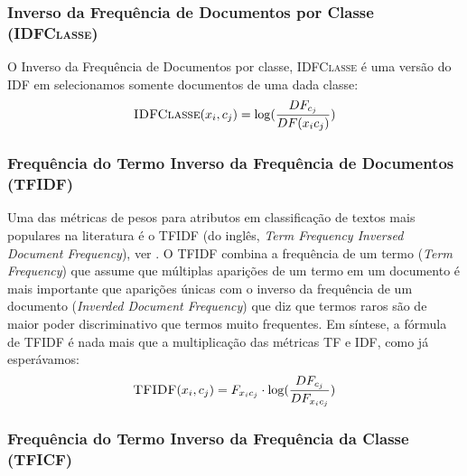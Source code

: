 
\subsubsection{Inverso da Frequência de Documentos por Classe (\textsc{IDFClasse})}
\label{subsubsection::idf}

O Inverso da Frequência de Documentos por classe, \textsc{IDFClasse} é uma versão do \textsc{IDF} em selecionamos somente documentos de uma dada classe:
\begin{equation}\label{eqn::tficf}
 \textsc{IDFClasse}(x_i,c_j) = \log( \frac{DF_{c_j}} {DF(x_ic_j)} )
\end{equation}



\subsubsection{Frequência do Termo Inverso da Frequência de Documentos (\textsc{TFIDF})}
\label{subsubsection::tfidf}

Uma das métricas de pesos para atributos em classificação de textos mais populares na literatura é o \textsc{TFIDF} (do inglês, \textit{Term Frequency Inversed Document Frequency}), ver \cite{Salton88}. O \textsc{TFIDF} combina a frequência de um termo (\textit{Term Frequency}) que assume que múltiplas aparições de um termo em um documento é mais importante que aparições únicas com o inverso da frequência de um documento (\textit{Inverded Document Frequency}) que diz que termos raros são de maior poder discriminativo que termos muito frequentes. Em síntese, a fórmula de \textsc{TFIDF} é nada mais que a multiplicação das métricas \textsc{TF} e \textsc{IDF}, como já esperávamos:
\begin{equation}\label{eqn::tficf}
 \textsc{TFIDF}(x_i, c_j) =  F_{x_ic_j} \cdot \log( \frac{DF_{c_j}}{ DF_{x_ic_j} } )
\end{equation}

\subsubsection{Frequência do Termo Inverso da Frequência da Classe (TFICF)}
\label{subsubsection::tficf}

